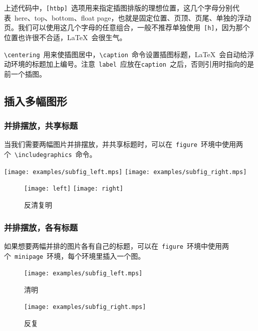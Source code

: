 上述代码中，\verb|[htbp]|~选项用来指定插图排版的理想位置，这几个字母分别代表~here、top、bottom、float page，也就是固定位置、页顶、页尾、单独的浮动页。我们可以使用这几个字母的任意组合，一般不推荐单独使用~\verb|[h]|，因为那个位置也许很不合适，\LaTeX~会很生气。

\verb|\centering|~用来使插图居中，\verb|\caption|~命令设置插图标题，\LaTeX~会自动给浮动环境的标题加上编号。注意~\verb|label|~应放在\verb|caption|~之后，否则引用时指向的是前一个插图。

\subsection{插入多幅图形}
\subsubsection{并排摆放，共享标题}
当我们需要两幅图片并排摆放，并共享标题时，可以在~\verb|figure|~环境中使用两个~\verb|\includegraphics|~命令。

\begin{fdemo}{
\centering
\texttt{[image: examples/subfig\_left.mps]}
\texttt{[image: examples/subfig\_right.mps]}
}
\begin{figure}[htbp]
\centering
\texttt{[image: left]}
\texttt{[image: right]}
\caption{反清复明}
\end{figure}
\end{fdemo}

\subsubsection{并排摆放，各有标题}
如果想要两幅并排的图片各有自己的标题，可以在~\verb|figure|~环境中使用两个~\verb|minipage|~环境，每个环境里插入一个图。

\begin{figure}[htbp]
\centering
\begin{minipage}[t]{0.3\textwidth}
    \centering
    \texttt{[image: examples/subfig\_left.mps]}
    \caption{清明}
\end{minipage}
\begin{minipage}[t]{0.3\textwidth}
    \centering
    \texttt{[image: examples/subfig\_right.mps]}
    \caption{反复}
\end{minipage}
\end{figure}

